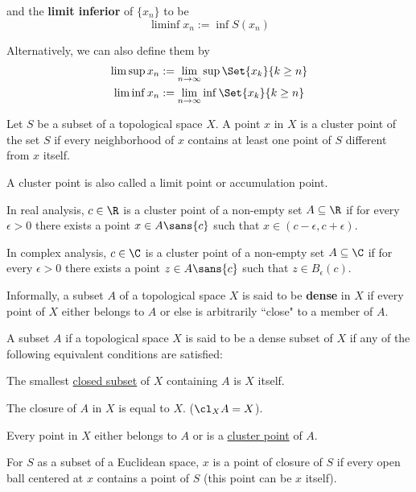 and the \textbf{limit inferior} of $\{x_n\}$ to be
$$
  \liminf x_n := \inf S(x_n)
$$

Alternatively, we can also define them by
\begin{align*}
  \limsup x_n & := \lim_{n\to\infty}\sup\Set{x_k}{k\geq n} \\
  \liminf x_n & := \lim_{n\to\infty}\inf\Set{x_k}{k\geq n}
\end{align*}

\label{b0219cd}

Let $S$ be a subset of a topological space $X$. A point $x$ in $X$ is a cluster
point of the set $S$ if every neighborhood of $x$ contains at least one point
of $S$ different from $x$ itself.

A cluster point is also called a limit point or accumulation point.

In real analysis, $c\in\R$ is a cluster point of a non-empty set $A\subseteq\R$
if for every $\epsilon>0$ there exists a point $x\in A\sans{c}$ such that
$x\in(c-\epsilon,c+\epsilon)$.

In complex analysis, $c\in\C$ is a cluster point of a non-empty set
$A\subseteq\C$ if for every $\epsilon>0$ there exists a point $z\in A\sans{c}$
such that $z\in B_\epsilon(c)$.

\label{e14819a}

Informally, a subset $A$ of a topological space $X$ is said to be
\textbf{dense} in $X$ if every point of $X$ either belongs to $A$ or else is
arbitrarily ``close" to a member of $A$.

A subset $A$ if a topological space $X$ is said to be a dense subset of $X$ if
any of the following equivalent conditions are satisfied:
\begin{enumerati}
  \item The smallest \href{deadb92}{closed subset} of $X$ containing $A$ is $X$ itself.
  \item The closure of $A$ in $X$ is equal to $X$. ($\cl_XA=X$).
  \item Every point in $X$ either belongs to $A$ or is a \href{b0219cd}{cluster point}
  of $A$.
\end{enumerati}

\label{f928932}

For $S$ as a subset of a Euclidean space, $x$ is a point of closure of $S$ if
every open ball centered at $x$ contains a point of $S$ (this point can be $x$
itself).

